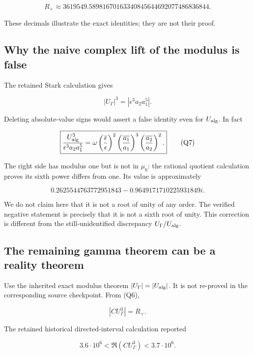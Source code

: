 \[
 R_+\approx3619549.58981670163340845644692077486836844.
\]

These decimals illustrate the exact identities; they are not their
proof.

\hypertarget{Q-why-the-naive-complex-lift-of-the-modulus-is-false}{%
\subsection{Why the naive complex lift of the modulus is
false}\label{Q-why-the-naive-complex-lift-of-the-modulus-is-false}}

The retained Stark calculation gives

\[
 |U_\Gamma|^3=|\epsilon^3a_2a_1^5|.
\]

Deleting absolute-value signs would assert a false identity even for
\(U_{\rm alg}\). In fact

\[
 \boxed{
 \frac{U_{\rm alg}^3}{\epsilon^3a_2a_1^5}
 =\omega\left(\frac{\overline\epsilon}{\epsilon}\right)^2
       \left(\frac{\overline{a_1}}{a_1}\right)^3
       \left(\frac{\overline{a_2}}{a_2}\right)^2.
 } \tag{Q7}
\]

The right side has modulus one but is not in \(\mu_6\): the rational
quotient calculation proves its sixth power differs from one. Its value
is approximately

\[
 0.2625544763772951843-0.9649171710225931849i.
\]

We do not claim here that it is not a root of unity of any order. The
verified negative statement is precisely that it is not a sixth root of
unity. This correction is different from the still-unidentified
discrepancy \(U_\Gamma/U_{\rm alg}\).

\hypertarget{Q-the-remaining-gamma-theorem-can-be-a-reality-theorem}{%
\subsection{The remaining gamma theorem can be a reality
theorem}\label{Q-the-remaining-gamma-theorem-can-be-a-reality-theorem}}

Use the inherited exact modulus theorem \(|U_\Gamma|=|U_{\rm alg}|\). It
is not re-proved in the corresponding source checkpoint. From (Q6),

\[
 |C U_\Gamma^3|=R_+.
\]

The retained historical directed-interval calculation reported

\[
 3.6\cdot10^6<\Re(C U_\Gamma^3)<3.7\cdot10^6.
\]

